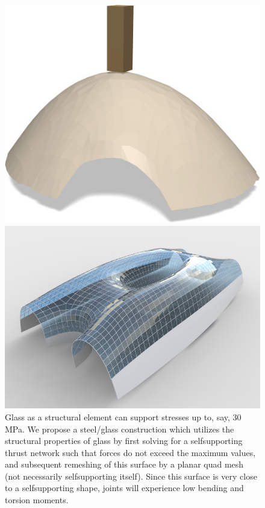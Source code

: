 \documentclass[review]{acmsiggraph}
\begin{document}
\begin{figure}[t]
	\centering
	\includegraphics[width=.6\columnwidth]{fig/load2.jpg}
	\caption{Testing stability. This self\dash supporting surface of 
length 24\,m is imagined as masonry of thickness 0.1\,m. It possesses a 
thrust network inside the masonry hull if -- for the sake of example -- a 
load of 11.000\,kg (shown in dark) is applied to a certain vertex. This 
means that the surface is still stable after that load is applied (N.B.\ 
This method of testing is rather conservative).}\label{fig:load}

\bigskip

	\includegraphics[width=\columnwidth]{arch-fig/structural79.jpg} 
\caption{Glass as a structural element can support stresses up to, say, 
30\,MPa. We propose a steel\slash glass construction which utilizes the 
structural properties of glass by first solving for a self\dash supporting 
thrust network such that forces do not exceed the maximum values, and 
subsequent remeshing of this surface by a planar quad mesh (not 
necessarily self\dash supporting itself). Since this surface is very 
close to a self\dash supporting shape, joints will experience low bending 
and torsion moments.} \label{fig:structural}


\vspace*{5.5cm}
\end{figure}
\end{document}
